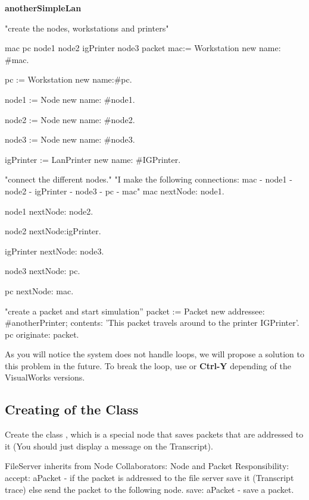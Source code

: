 \begin{code}
\textbf{anotherSimpleLan}

"create the nodes, workstations and printers"

{\textbar}mac pc node1 node2 igPrinter node3 packet {\textbar}
mac:= Workstation new name: \#mac.

pc := Workstation new name:\#pc.

node1 := Node new name: \#node1.

node2 := Node new name: \#node2.

node3 := Node new name: \#node3.

igPrinter := LanPrinter new name: \#IGPrinter.

"connect the different nodes." "I make the following connections:
\tab \tab mac -\ct{>} node1 -\ct{>} node2 -\ct{>} \tab
\tab igPrinter -\ct{>} node3 -\ct{>} pc -\ct{>} mac"
mac nextNode: node1.

node1 nextNode: node2.

node2 nextNode:igPrinter.

igPrinter nextNode: node3.

node3 nextNode: pc.

pc nextNode: mac.

"create a packet and start simulation''
packet := Packet new
             addressee: \#anotherPrinter;
             contents: 'This packet travels around 
             to the printer IGPrinter'.
pc originate: packet.
\end{code}


As you will notice the system does not handle loops, we will
propose a solution to this problem in the future. To break the
loop, use or \textbf{Ctrl-Y} depending of the VisualWorks versions.

\subsection*{Creating of the Class }

Create the class , which is a special node that
saves packets that are addressed to it (You should just display a
message on the Transcript).


\begin{code}
FileServer inherits from Node
Collaborators: Node and Packet
Responsibility:
accept: aPacket - if the packet is addressed to the
file server save it (Transcript trace) else send the 
packet to the following node.
save: aPacket - save a packet.
\end{code}

\ifx\wholebook\relax\else\fi
